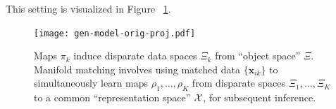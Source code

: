 \documentclass[12pt,oneside,final]{thesis}\usepackage[]{graphicx}\usepackage[]{color}
\begin{document}
 This setting is visualized in  Figure ~\ref{fig:multisensor}.

\begin{figure}
  \begin{center}
\texttt{[image: gen-model-orig-proj.pdf]}
 \caption{Maps $\pi_k$ induce disparate data spaces $\Xi_k$ from ``object space'' $\Xi$.
    Manifold matching involves using matched data $\{\bm{x}_{ik}\}$
    to simultaneously learn maps $\rho_1,\ldots,\rho_K$
    from disparate spaces 
    $\Xi_1,\ldots,\Xi_K$
  to a common ``representation space'' $\mathcal{X}$, for subsequent inference.\label{fig:multisensor}}
  \end{center}
  
\end{figure}

\end{document}
